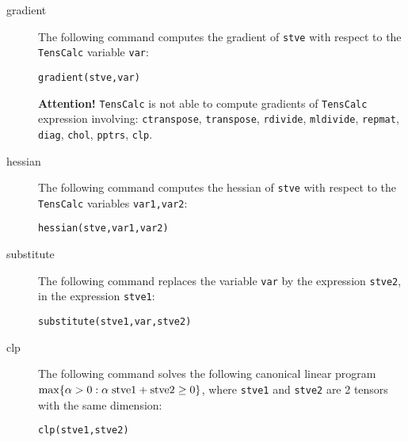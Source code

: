 \documentclass[11pt]{article}
\newcommand{\TC}{\texttt{TensCalc}}
\theoremstyle{remark}
\begin{document}
\begin{description}
\item[gradient] The following command computes the gradient of
  \lstinline{stve} with respect to the \TC{} variable \lstinline{var}:
\begin{lstlisting}
gradient(stve,var)
\end{lstlisting}

  \textbf{Attention!} \TC{} is not able to compute gradients of \TC{}
  expression involving: \lstinline{ctranspose}, \lstinline{transpose},
  \lstinline{rdivide}, \lstinline{mldivide}, \lstinline{repmat},
  \lstinline{diag}, \lstinline{chol}, \lstinline{pptrs}, \lstinline{clp}.

\item[hessian] The following command computes the hessian of
  \lstinline{stve} with respect to the \TC{} variables \lstinline{var1,var2}:
\begin{lstlisting}
hessian(stve,var1,var2)
\end{lstlisting}

\item[substitute] The following command replaces the variable
  \lstinline{var} by the expression \lstinline{stve2}, in the
  expression \lstinline{stve1}:
\begin{lstlisting}
substitute(stve1,var,stve2)
\end{lstlisting}


\item[clp] The following command solves the following canonical linear
  program $\max\{\alpha>0: \alpha \;\lstinline{stve1} + \lstinline{stve2} \ge 0\}$,
  where \lstinline{stve1} and \lstinline{stve2} are 2 tensors with the
  same dimension:
\begin{lstlisting}
clp(stve1,stve2)
\end{lstlisting}
  

\end{description}
\end{document}
